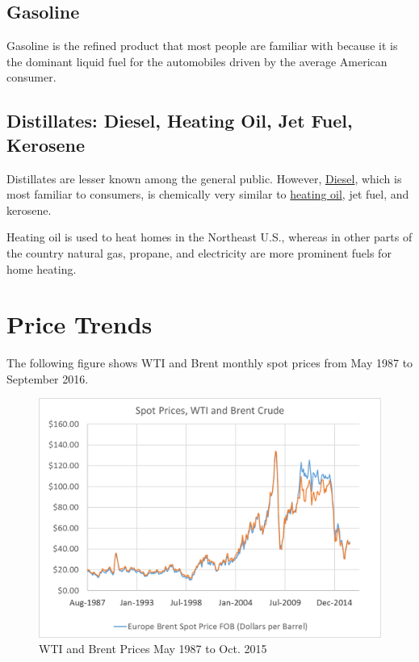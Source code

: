 \documentclass[]{book}
\theoremstyle{definition}
\theoremstyle{definition}
\theoremstyle{remark}
\begin{document}
\subsection{Gasoline}\label{gasoline}

Gasoline is the refined product that most people are familiar with
because it is the dominant liquid fuel for the automobiles driven by the
average American consumer.

\subsection{Distillates: Diesel, Heating Oil, Jet Fuel,
Kerosene}\label{distillates-diesel-heating-oil-jet-fuel-kerosene}

Distillates are lesser known among the general public. However,
\href{http://www.eia.gov/Energyexplained/index.cfm?page=diesel_home}{Diesel},
which is most familiar to consumers, is chemically very similar to
\href{http://www.eia.gov/Energyexplained/index.cfm?page=heating_oil_use}{heating
oil}, jet fuel, and kerosene.

Heating oil is used to heat homes in the Northeast U.S., whereas in
other parts of the country natural gas, propane, and electricity are
more prominent fuels for home heating.

\section{Price Trends}\label{price-trends}

The following figure shows WTI and Brent monthly spot prices from May
1987 to September 2016.

\begin{figure}[htbp]
\centering
\includegraphics{Excel-files/CrudeOiland-crudeoil_files/image003.png}
\caption{WTI and Brent Prices May 1987 to Oct. 2015}
\end{figure}
\end{document}
